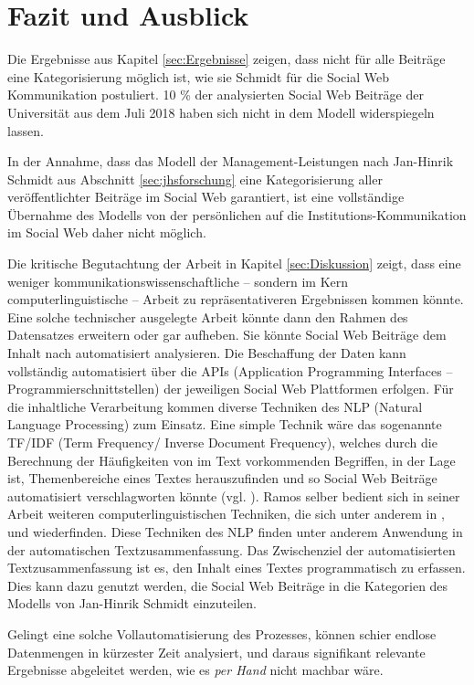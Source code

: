 \chapter{Fazit und Ausblick}
\label{chap:Fazit}


Die Ergebnisse aus Kapitel \ref{sec:Ergebnisse} zeigen, dass nicht für alle Beiträge eine Kategorisierung möglich ist, wie sie Schmidt für die Social Web Kommunikation postuliert. 10 \% der analysierten Social Web Beiträge der Universität aus dem Juli 2018 haben sich nicht in dem Modell widerspiegeln lassen.

In der Annahme, dass das Modell der Management-Leistungen nach Jan-Hinrik Schmidt aus Abschnitt \ref{sec:jhsforschung} eine Kategorisierung aller veröffentlichter Beiträge im Social Web garantiert, ist eine vollständige Übernahme des Modells von der persönlichen auf die Institutions-Kommunikation im Social Web daher nicht möglich. 

Die kritische Begutachtung der Arbeit in Kapitel \ref{sec:Diskussion} zeigt, dass eine weniger kommunikationswissenschaftliche -- sondern im Kern computerlinguistische -- Arbeit zu repräsentativeren Ergebnissen kommen könnte. Eine solche technischer ausgelegte Arbeit könnte dann den Rahmen des Datensatzes erweitern oder gar aufheben. Sie könnte Social Web Beiträge dem Inhalt nach automatisiert analysieren. Die Beschaffung der Daten kann vollständig automatisiert über die APIs (Application Programming Interfaces -- Programmierschnittstellen) der jeweiligen Social Web Plattformen erfolgen. Für die inhaltliche Verarbeitung kommen diverse Techniken des NLP (Natural Language Processing) zum Einsatz. Eine simple Technik wäre das sogenannte TF/IDF (Term Frequency/ Inverse Document Frequency), welches durch die Berechnung der Häufigkeiten von im Text vorkommenden Begriffen, in der Lage ist, Themenbereiche eines Textes herauszufinden und so Social Web Beiträge automatisiert verschlagworten könnte (vgl. \cite{ramos2003tfidf}). Ramos selber bedient sich in seiner Arbeit weiteren computerlinguistischen Techniken, die sich unter anderem in \cite{kiss2006unsupervised}, \cite{mitkov2012coreference} und \cite{uryupina2006coreference} wiederfinden. Diese Techniken des NLP finden unter anderem Anwendung in der automatischen Textzusammenfassung. Das Zwischenziel der automatisierten Textzusammenfassung ist es, den Inhalt eines Textes programmatisch zu erfassen. Dies kann dazu genutzt werden, die Social Web Beiträge in die Kategorien des Modells von Jan-Hinrik Schmidt einzuteilen.

Gelingt eine solche Vollautomatisierung des Prozesses, können schier endlose Datenmengen in kürzester Zeit analysiert, und daraus signifikant relevante Ergebnisse abgeleitet werden, wie es \textit{per Hand} nicht machbar wäre.
